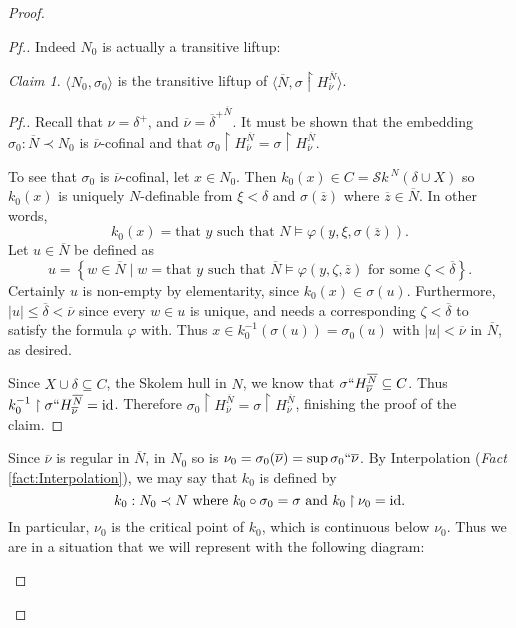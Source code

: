 \documentclass{amsart}
\theoremstyle{definition}
\theoremstyle{remark}
\newtheorem{claimno}{Claim}
\newcommand{\N}{{\overline{N}}}
\newcommand{\id}{\textup{\ensuremath{\text{id}}}}
\newcommand{\st}{\; | \;}
\newcommand{\set}[2]{\left\{#1\st #2 \right\}}
\newcommand{\rest}{\mathbin{\upharpoonright}}
\newcommand{\SH}{\mathcal{S}\textit{k} \,}
\newcommand{\Sk}[3]{\SH^{#1}( {#2} \cup {#3} ) }
\begin{document}
\begin{proof}
\begin{proof}[Pf.]
Indeed $N_0$ is actually a transitive liftup:

\begin{claimno} $\langle N_0, \sigma_0 \rangle$ is the transitive liftup of $\langle \N, \sigma \upharpoonright H_{\overline \nu}^{\N} \rangle$. \end{claimno}
\begin{proof}[Pf.] Recall that $\nu=\delta^+$, and $\overline \nu={\overline \delta^+}^{\N}$. It must be shown that the embedding $\sigma_0: \overline N \prec N_0$ is $\overline \nu$-cofinal and that $\sigma_0 \upharpoonright H_{\overline \nu}^{\N}=\sigma \upharpoonright H_{\overline \nu}^{\overline N}$. 

To see that $\sigma_0$ is $\overline \nu$-cofinal, let $x \in N_0$. Then $k_0(x) \in C = \Sk{N}{\delta}{X}$ so $k_0(x)$ is uniquely $N$-definable from $\xi < \delta$ and $\sigma(\overline z)$ where $\overline z \in \N$. In other words, $$k_0(x) = \text{that } y \text{ such that } N \models \varphi(y, \xi, \sigma(\overline z)).$$ Let $u \in \N$ be defined as 
	$$u=\set{ w \in \N }{  w=\text{that } y \text{ such that } \N \models \varphi(y, \zeta, \overline z) \text{ for some } \zeta < \overline \delta }.$$
Certainly $u$ is non-empty by elementarity, since $k_0(x) \in \sigma(u).$
Furthermore, $|u| \leq \overline \delta < \overline \nu$ since every $w \in u$ is unique, and needs a corresponding $\zeta<\overline \delta$ to satisfy the formula $\varphi$ with.
Thus $x \in k_0^{-1}(\sigma(u))=\sigma_0(u)$ with $|u| < \overline \nu$ in $\N$, as desired. 

Since $X \cup \delta \subseteq C$, the Skolem hull in $N$, we know that $\sigma``H_{\overline \nu}^{\N} \subseteq C$. Thus $k_0^{-1} \upharpoonright \sigma``H_{\overline \nu}^{\overline N} = \text{id}$. Therefore $\sigma_0 \rest H_{\overline \nu}^{\N}=\sigma \rest H_{\overline \nu}^{\overline N}$, finishing the proof of the claim.
\end{proof}

Since $\overline \nu$ is regular in $\N$, in $N_0$ so is $\nu_0=\sigma_0(\overline \nu)=\sup \sigma_0``\overline \nu$. By Interpolation (\textit{Fact} \ref{fact:Interpolation}), we may say that $k_0$ is defined by 
	$$k_0: N_0 \prec N \text{ where } k_0 \circ \sigma_0=\sigma \text{ and } k_0 \rest \nu_0 = \id.$$
In particular, $\nu_0$ is the critical point of $k_0$, which is continuous below $\nu_0$. Thus we are in a situation that we will represent with the following  diagram:
\begin{center}
\end{center}
\end{proof}
\end{proof}
\end{document}
